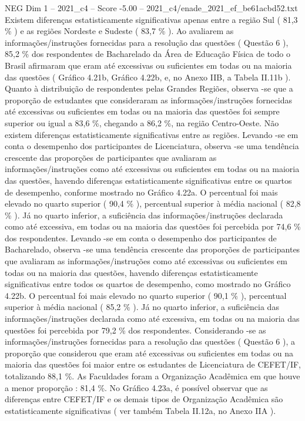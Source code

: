 \begin{textsample}{NEG Dim 1 – 2021\_c4 – Score -5.00 – 2021\_c4/enade\_2021\_ef\_be61acbd52.txt}
Existem diferenças estatisticamente significativas apenas entre a região Sul ( 81,3 \% ) e as regiões Nordeste e Sudeste ( 83,7 \% ).
Ao avaliarem as informações/instruções fornecidas para a resolução das questões ( Questão 6 ), 85,2 \% dos respondentes de Bacharelado da Área de Educação Física de todo o Brasil afirmaram que eram até excessivas ou suficientes em todas ou na maioria das questões ( Gráfico 4.21b, Gráfico 4.22b, e, no Anexo IIB, a Tabela II.11b ).
Quanto à distribuição de respondentes pelas Grandes Regiões, observa -se que a proporção de estudantes que consideraram as informações/instruções fornecidas até excessivas ou suficientes em todas ou na maioria das questões foi sempre superior ou igual a 83,6 \%, chegando a 86,2 \%, na região Centro-Oeste.
Não existem diferenças estatisticamente significativas entre as regiões.
Levando -se em conta o desempenho dos participantes de Licenciatura, observa -se uma tendência crescente das proporções de participantes que avaliaram as informações/instruções como até excessivas ou suficientes em todas ou na maioria das questões, havendo diferenças estatisticamente significativas entre os quartos de desempenho, conforme mostrado no Gráfico 4.22a.
O percentual foi mais elevado no quarto superior ( 90,4 \% ), percentual superior à média nacional ( 82,8 \% ).
Já no quarto inferior, a suficiência das informações/instruções declarada como até excessiva, em todas ou na maioria das questões foi percebida por 74,6 \% dos respondentes.
Levando -se em conta o desempenho dos participantes de Bacharelado, observa -se uma tendência crescente das proporções de participantes que avaliaram as informações/instruções como até excessivas ou suficientes em todas ou na maioria das questões, havendo diferenças estatisticamente significativas entre todos os quartos de desempenho, como mostrado no Gráfico 4.22b.
O percentual foi mais elevado no quarto superior ( 90,1 \% ), percentual superior à média nacional ( 85,2 \% ).
Já no quarto inferior, a suficiência das informações/instruções declarada como até excessiva, em todas ou na maioria das questões foi percebida por 79,2 \% dos respondentes.
Considerando -se as informações/instruções fornecidas para a resolução das questões ( Questão 6 ), a proporção que considerou que eram até excessivas ou suficientes em todas ou na maioria das questões foi maior entre os estudantes de Licenciatura de CEFET/IF, totalizando 88,1 \%.
As Faculdades foram a Organização Acadêmica em que houve a menor proporção : 81,4 \%.
No Gráfico 4.23a, é possível observar que as diferenças entre CEFET/IF e os demais tipos de Organização Acadêmica são estatisticamente significativas ( ver também Tabela II.12a, no Anexo IIA ).

\end{textsample}
